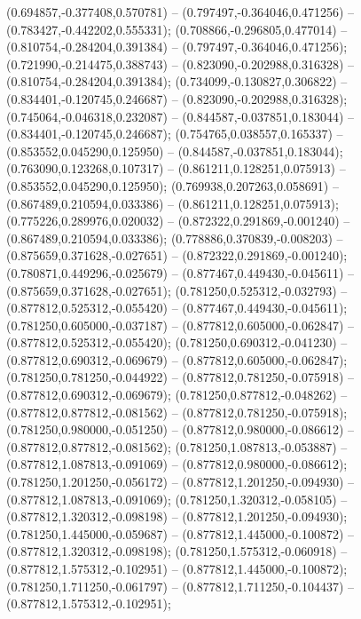  (0.694857,-0.377408,0.570781) -- (0.797497,-0.364046,0.471256) -- (0.783427,-0.442202,0.555331);
 (0.708866,-0.296805,0.477014) -- (0.810754,-0.284204,0.391384) -- (0.797497,-0.364046,0.471256);
 (0.721990,-0.214475,0.388743) -- (0.823090,-0.202988,0.316328) -- (0.810754,-0.284204,0.391384);
 (0.734099,-0.130827,0.306822) -- (0.834401,-0.120745,0.246687) -- (0.823090,-0.202988,0.316328);
 (0.745064,-0.046318,0.232087) -- (0.844587,-0.037851,0.183044) -- (0.834401,-0.120745,0.246687);
 (0.754765,0.038557,0.165337) -- (0.853552,0.045290,0.125950) -- (0.844587,-0.037851,0.183044);
 (0.763090,0.123268,0.107317) -- (0.861211,0.128251,0.075913) -- (0.853552,0.045290,0.125950);
 (0.769938,0.207263,0.058691) -- (0.867489,0.210594,0.033386) -- (0.861211,0.128251,0.075913);
 (0.775226,0.289976,0.020032) -- (0.872322,0.291869,-0.001240) -- (0.867489,0.210594,0.033386);
 (0.778886,0.370839,-0.008203) -- (0.875659,0.371628,-0.027651) -- (0.872322,0.291869,-0.001240);
 (0.780871,0.449296,-0.025679) -- (0.877467,0.449430,-0.045611) -- (0.875659,0.371628,-0.027651);
 (0.781250,0.525312,-0.032793) -- (0.877812,0.525312,-0.055420) -- (0.877467,0.449430,-0.045611);
 (0.781250,0.605000,-0.037187) -- (0.877812,0.605000,-0.062847) -- (0.877812,0.525312,-0.055420);
 (0.781250,0.690312,-0.041230) -- (0.877812,0.690312,-0.069679) -- (0.877812,0.605000,-0.062847);
 (0.781250,0.781250,-0.044922) -- (0.877812,0.781250,-0.075918) -- (0.877812,0.690312,-0.069679);
 (0.781250,0.877812,-0.048262) -- (0.877812,0.877812,-0.081562) -- (0.877812,0.781250,-0.075918);
 (0.781250,0.980000,-0.051250) -- (0.877812,0.980000,-0.086612) -- (0.877812,0.877812,-0.081562);
 (0.781250,1.087813,-0.053887) -- (0.877812,1.087813,-0.091069) -- (0.877812,0.980000,-0.086612);
 (0.781250,1.201250,-0.056172) -- (0.877812,1.201250,-0.094930) -- (0.877812,1.087813,-0.091069);
 (0.781250,1.320312,-0.058105) -- (0.877812,1.320312,-0.098198) -- (0.877812,1.201250,-0.094930);
 (0.781250,1.445000,-0.059687) -- (0.877812,1.445000,-0.100872) -- (0.877812,1.320312,-0.098198);
 (0.781250,1.575312,-0.060918) -- (0.877812,1.575312,-0.102951) -- (0.877812,1.445000,-0.100872);
 (0.781250,1.711250,-0.061797) -- (0.877812,1.711250,-0.104437) -- (0.877812,1.575312,-0.102951);
